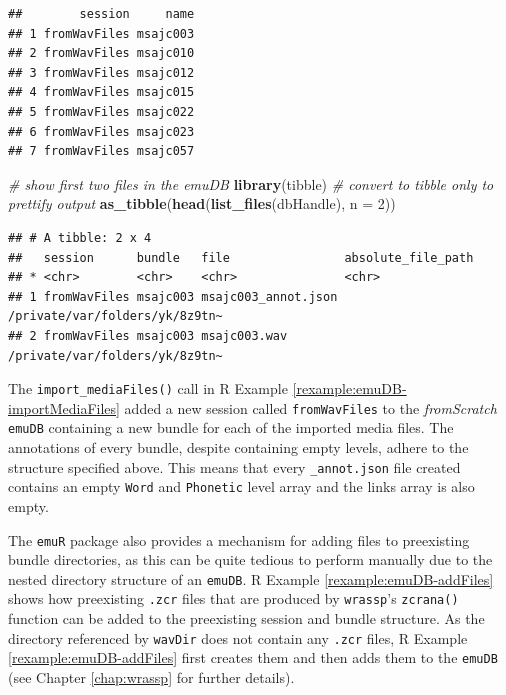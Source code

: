 \documentclass[]{book}
\newenvironment{Shaded}{\begin{snugshade}}{\end{snugshade}}
\newcommand{\CommentTok}[1]{\textcolor[rgb]{0.56,0.35,0.01}{\textit{#1}}}
\newcommand{\DataTypeTok}[1]{\textcolor[rgb]{0.13,0.29,0.53}{#1}}
\newcommand{\DecValTok}[1]{\textcolor[rgb]{0.00,0.00,0.81}{#1}}
\newcommand{\KeywordTok}[1]{\textcolor[rgb]{0.13,0.29,0.53}{\textbf{#1}}}
\newcommand{\NormalTok}[1]{#1}
\theoremstyle{definition}
\theoremstyle{definition}
\theoremstyle{definition}
\theoremstyle{remark}
\begin{document}
\begin{verbatim}
##        session     name
## 1 fromWavFiles msajc003
## 2 fromWavFiles msajc010
## 3 fromWavFiles msajc012
## 4 fromWavFiles msajc015
## 5 fromWavFiles msajc022
## 6 fromWavFiles msajc023
## 7 fromWavFiles msajc057
\end{verbatim}

\begin{Shaded}
\begin{Highlighting}[]
\CommentTok{# show first two files in the emuDB}
\KeywordTok{library}\NormalTok{(tibble) }\CommentTok{# convert to tibble only to prettify output}
\KeywordTok{as_tibble}\NormalTok{(}\KeywordTok{head}\NormalTok{(}\KeywordTok{list_files}\NormalTok{(dbHandle), }\DataTypeTok{n =} \DecValTok{2}\NormalTok{))}
\end{Highlighting}
\end{Shaded}

\begin{verbatim}
## # A tibble: 2 x 4
##   session      bundle   file                absolute_file_path            
## * <chr>        <chr>    <chr>               <chr>                         
## 1 fromWavFiles msajc003 msajc003_annot.json /private/var/folders/yk/8z9tn~
## 2 fromWavFiles msajc003 msajc003.wav        /private/var/folders/yk/8z9tn~
\end{verbatim}

The \texttt{import\_mediaFiles()} call in R Example
\ref{rexample:emuDB-importMediaFiles} added a new session called
\texttt{fromWavFiles} to the \emph{fromScratch} \texttt{emuDB}
containing a new bundle for each of the imported media files. The
annotations of every bundle, despite containing empty levels, adhere to
the structure specified above. This means that every
\texttt{\_annot.json} file created contains an empty \texttt{Word} and
\texttt{Phonetic} level array and the links array is also empty.

The \texttt{emuR} package also provides a mechanism for adding files to
preexisting bundle directories, as this can be quite tedious to perform
manually due to the nested directory structure of an \texttt{emuDB}. R
Example \ref{rexample:emuDB-addFiles} shows how preexisting
\texttt{.zcr} files that are produced by \texttt{wrassp}'s
\texttt{zcrana()} function can be added to the preexisting session and
bundle structure. As the directory referenced by \texttt{wavDir} does
not contain any \texttt{.zcr} files, R Example
\ref{rexample:emuDB-addFiles} first creates them and then adds them to
the \texttt{emuDB} (see Chapter \ref{chap:wrassp} for further details).
\end{document}
